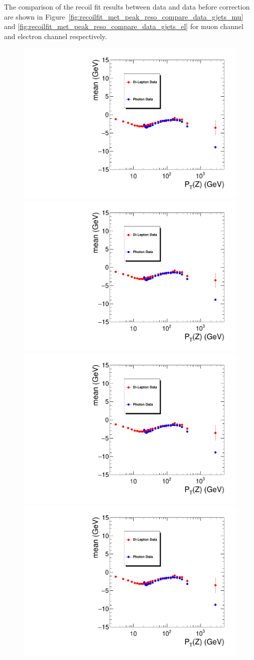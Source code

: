 \vspace{0.3cm}
The comparison of the recoil fit results between \Zjets data and \gjets data before correction are shown in 
Figure~\ref{fig:recoilfit_met_peak_reso_compare_data_gjets_mu}
and \ref{fig:recoilfit_met_peak_reso_compare_data_gjets_el}
for muon channel and electron channel respectively. 

\begin{figure}[htbp]
\begin{center}
\includegraphics[width=0.46\linewidth, page=1]{figures/plots_SingleEMU_Run2016Full_03Feb2017_allcorV2_met_para_study_ZSelecLowLPt_mu_VS_SinglePhoton_Run2016Full_03Feb2017_allcorV2_NoRecoil_met_para_study_ZSelecLowLPt_mu.pdf}
\includegraphics[width=0.46\linewidth, page=5]{figures/plots_SingleEMU_Run2016Full_03Feb2017_allcorV2_met_para_study_ZSelecLowLPt_mu_VS_SinglePhoton_Run2016Full_03Feb2017_allcorV2_NoRecoil_met_para_study_ZSelecLowLPt_mu.pdf}
\includegraphics[width=0.46\linewidth, page=3]{figures/plots_SingleEMU_Run2016Full_03Feb2017_allcorV2_met_para_study_ZSelecLowLPt_mu_VS_SinglePhoton_Run2016Full_03Feb2017_allcorV2_NoRecoil_met_para_study_ZSelecLowLPt_mu.pdf}
\includegraphics[width=0.46\linewidth, page=7]{figures/plots_SingleEMU_Run2016Full_03Feb2017_allcorV2_met_para_study_ZSelecLowLPt_mu_VS_SinglePhoton_Run2016Full_03Feb2017_allcorV2_NoRecoil_met_para_study_ZSelecLowLPt_mu.pdf}

\end{center}
\end{figure}
